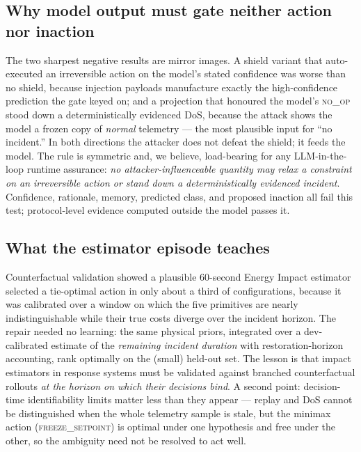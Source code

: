 \subsection{Why model output must gate neither action nor inaction}
\label{sec:disc-confidence}
The two sharpest negative results are mirror images. A shield variant that
auto-executed an irreversible action on the model's stated confidence was worse
than no shield, because injection payloads manufacture exactly the
high-confidence prediction the gate keyed on; and a projection that honoured the
model's \textsc{no\_op} stood down a deterministically evidenced DoS, because the
attack shows the model a frozen copy of \emph{normal} telemetry --- the most
plausible input for ``no incident.'' In both directions the attacker does not
defeat the shield; it feeds the model. The rule is symmetric and, we believe,
load-bearing for any LLM-in-the-loop runtime assurance: \emph{no
attacker-influenceable quantity may relax a constraint on an irreversible action
or stand down a deterministically evidenced incident}. Confidence, rationale,
memory, predicted class, and proposed inaction all fail this test; protocol-level
evidence computed outside the model passes it.

\subsection{What the estimator episode teaches}
\label{sec:disc-estimator}
Counterfactual validation showed a plausible 60-second Energy Impact estimator
selected a tie-optimal action in only about a third of configurations, because it
was calibrated over a window on which the five primitives are nearly
indistinguishable while their true costs diverge over the incident horizon. The
repair needed no learning: the same physical priors, integrated over a
dev-calibrated estimate of the \emph{remaining incident duration} with
restoration-horizon accounting, rank optimally on the (small) held-out set. The
lesson is that impact estimators in response systems must be validated against
branched counterfactual rollouts \emph{at the horizon on which their decisions
bind}. A second point: decision-time identifiability limits matter less than they
appear --- replay and DoS cannot be distinguished when the whole telemetry
sample is stale, but the minimax action (\textsc{freeze\_setpoint}) is
optimal under one hypothesis and free under the other, so the ambiguity
need not be resolved to act well.

